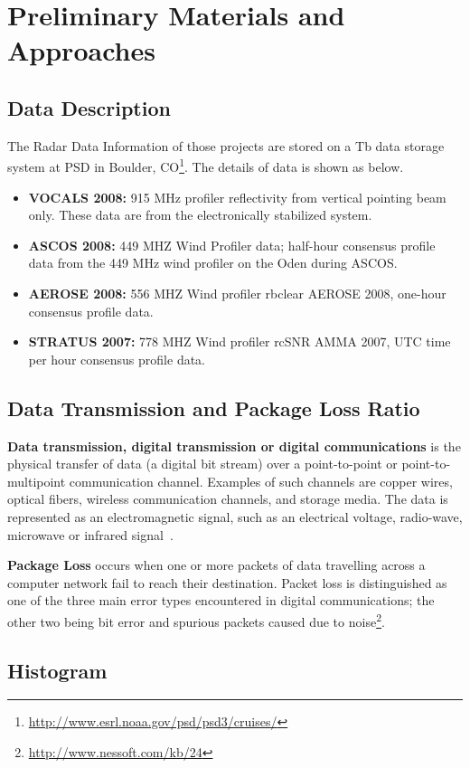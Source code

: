 \documentclass[times, 10pt,onecolumn]{article} %
\begin{document}
\section{Preliminary Materials and Approaches}
\subsection{Data Description}
The Radar Data Information of those projects are stored on a Tb data storage system at PSD in Boulder, CO\footnote{\url{http://www.esrl.noaa.gov/psd/psd3/cruises/}}. The details of data is shown as below.
\begin{itemize}
  \item \textbf{VOCALS 2008:} 915 MHz profiler reflectivity from vertical pointing beam only. These data are from the electronically stabilized system. 
\item \textbf{ASCOS 2008:} 449 MHZ Wind Profiler data; half-hour consensus profile data from the 449 MHz wind profiler on the Oden during ASCOS.  
\item \textbf{AEROSE 2008:} 556 MHZ Wind profiler rbclear AEROSE 2008, one-hour consensus profile data.
\item \textbf{STRATUS 2007:} 778 MHZ Wind profiler rcSNR AMMA 2007, UTC time per hour consensus profile data.
\end{itemize}
\subsection{Data Transmission and Package Loss Ratio}
\textbf{Data transmission, digital transmission or digital communications} is the physical transfer of data (a digital bit stream) over a point-to-point or point-to-multipoint communication channel. Examples of such channels are copper wires, optical fibers, wireless communication channels, and storage media. The data is represented as an electromagnetic signal, such as an electrical voltage, radio-wave, microwave or infrared signal~\cite{PDAT}. 

\textbf{Package Loss} occurs when one or more packets of data travelling across a computer network fail to reach their destination. Packet loss is distinguished as one of the three main error types encountered in digital communications; the other two being bit error and spurious packets caused due to noise\footnote{\url{http://www.nessoft.com/kb/24}}.
\subsection{Histogram}
\end{document}
